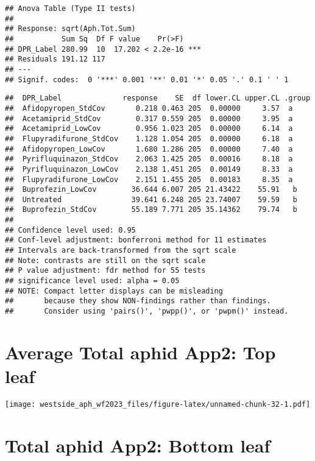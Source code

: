 \documentclass[
]{article}
\begin{document}
\begin{verbatim}
## Anova Table (Type II tests)
## 
## Response: sqrt(Aph.Tot.Sum)
##           Sum Sq  Df F value    Pr(>F)    
## DPR_Label 280.99  10  17.202 < 2.2e-16 ***
## Residuals 191.12 117                      
## ---
## Signif. codes:  0 '***' 0.001 '**' 0.01 '*' 0.05 '.' 0.1 ' ' 1
\end{verbatim}

\begin{verbatim}
##  DPR_Label              response    SE  df lower.CL upper.CL .group
##  Afidopyropen_StdCov       0.218 0.463 205  0.00000     3.57  a    
##  Acetamiprid_StdCov        0.317 0.559 205  0.00000     3.95  a    
##  Acetamiprid_LowCov        0.956 1.023 205  0.00000     6.14  a    
##  Flupyradifurone_StdCov    1.128 1.054 205  0.00000     6.18  a    
##  Afidopyropen_LowCov       1.680 1.286 205  0.00000     7.40  a    
##  Pyrifluquinazon_StdCov    2.063 1.425 205  0.00016     8.18  a    
##  Pyrifluquinazon_LowCov    2.138 1.451 205  0.00149     8.33  a    
##  Flupyradifurone_LowCov    2.151 1.455 205  0.00183     8.35  a    
##  Buprofezin_LowCov        36.644 6.007 205 21.43422    55.91   b   
##  Untreated                39.641 6.248 205 23.74007    59.59   b   
##  Buprofezin_StdCov        55.189 7.771 205 35.14362    79.74   b   
## 
## Confidence level used: 0.95 
## Conf-level adjustment: bonferroni method for 11 estimates 
## Intervals are back-transformed from the sqrt scale 
## Note: contrasts are still on the sqrt scale 
## P value adjustment: fdr method for 55 tests 
## significance level used: alpha = 0.05 
## NOTE: Compact letter displays can be misleading
##       because they show NON-findings rather than findings.
##       Consider using 'pairs()', 'pwpp()', or 'pwpm()' instead.
\end{verbatim}

\hypertarget{average-total-aphid-app2-top-leaf}{%
\section{Average Total aphid App2: Top
leaf}\label{average-total-aphid-app2-top-leaf}}

\texttt{[image: westside\_aph\_wf2023\_files/figure-latex/unnamed-chunk-32-1.pdf]}

\hypertarget{total-aphid-app2-bottom-leaf}{%
\section{Total aphid App2: Bottom
leaf}\label{total-aphid-app2-bottom-leaf}}
\end{document}
